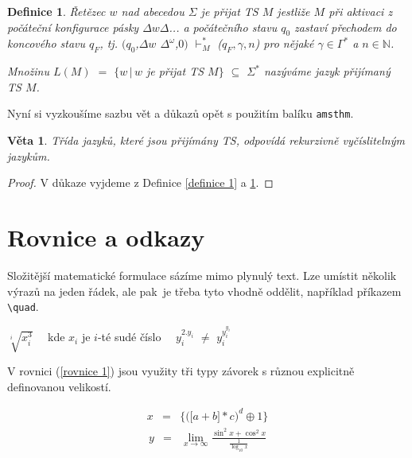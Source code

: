 \documentclass[11pt, a4paper, twocolumn]{article}
\newtheorem{def1}{Definice}
\newtheorem{sent1}{Věta}
\begin{document}
\def\specdash{\mathop{\vdash}}

\begin{def1}
\label{definice 2}
\textup{Řetězec} $w$ \textup{nad abecedou} $\Sigma$ \textup{je přijat TS} $M$ \:jestliže $M$ při aktivaci z počáteční konfigurace pásky
\underline{$\Delta$}$w$$\Delta$... a počátečního stavu $q_0$ zastaví přechodem do \:koncového stavu $q_F$, tj. $($$q_0$,$\Delta w$ $\Delta^\omega$,$0)$ $\displaystyle \specdash_M^*$ ($q_F, \gamma,n$) pro
nějaké $\gamma\in\Gamma^*$ a $n\in \mathbb{N}$.

Množinu $L(M)$ $=$ $\{w\,|\,w$ je přijat TS $M\}$ $\subseteq$ $\Sigma^*$ nazýváme \textup{jazyk přijímaný TS} $M$.
\end{def1}

Nyní si vyzkoušíme sazbu vět a důkazů opět s použitím balíku \verb|amsthm|.

\begin{sent1}Třída jazyků, které jsou přijímány TS, odpovídá
\textup{rekurzivně vyčíslitelným jazykům.}
\end{sent1}

\begin{proof}
V důkaze vyjdeme z Definice \ref{definice 1} a \ref{definice 2}.
\end{proof}


\section{Rovnice a odkazy}

Složitější matematické formulace sázíme mimo plynulý text. Lze umístit několik výrazů na jeden řádek, ale pak~je třeba tyto vhodně oddělit, například příkazem \verb|\quad|.

\begin{center}
$\sqrt[i]{x_i^3}\quad$ kde $x_i$ je $i$-té sudé číslo $\quad y_i^{2.y_i}$ $\ne$ $y_i^{y_i^{y_i}}$
\end{center}

V rovnici (\ref{rovnice 1}) jsou využity tři typy závorek s různou explicitně definovanou velikostí.

\begin{eqnarray}\label{rovnice 1}
    x & = & \bigg\{ \Big( \big[a+b\big] * c\Big)^d  \oplus 1\bigg\}
\end{eqnarray}
\vspace{-1.5em}
\begin{eqnarray*}
    y & = & \lim_{x\to\infty}\frac{\sin^2 x + \cos^2 x}{\frac{1}{\log_{10} x}}
\end{eqnarray*}
\end{document}
